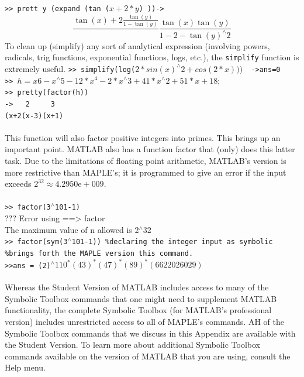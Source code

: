 \documentclass[../main.tex]{subfiles}
\begin{document}
\texttt{>> prett y (expand (tan ($x+2*y$) ))->}
$$
\frac{\tan (x)+2 \frac{\tan (y)}{1-\tan (y)}}{} \frac{\tan (x) \tan (y)}{1-2-\tan (y)^{\wedge}2}
$$
To clean up (simplify) any sort of analytical expression (involving powers, 
radicals, trig functions, exponential functions, logs, etc.), the \texttt{simplify} function 
is extremely useful. 
\texttt{>> simplify(log($2*sin(x)^{\wedge}2+cos(2*x)))$~~->ans=0 }\\
\texttt{>> $h=x 6-x^{\wedge}5-12*x^4-2*x^{\wedge}3+41*x^{\wedge}2+51*x+18;$ }\\
\texttt{>> pretty(factor(h)) }\\
\texttt{->  ~~2 ~~~ 3 }\\
\texttt{(x+2(x-3)(x+1)}\\
\\
This function will also factor positive integers into primes. This brings up an important point. MATLAB also has a function factor that (only) does this latter task. Due to the limitations of floating point arithmetic, MATLAB's version is more restrictive than MAPLE's; it is programmed to give an error if the input exceeds $2^{32} \approx 4.2950 \mathrm{e}+009$.
\\
\\
\texttt{>> factor(3$^{\wedge}$101-1) }\\
??? Error using ==> factor \\
The maximum value of n allowed is 2$^{\wedge}$32\\
\texttt{>> factor(sym(3$^{\wedge}$101-1)) \%declaring the integer input as symbolic 
}\\
\texttt{\%brings forth the MAPLE version this command. 
}\\
\texttt{>>ans = (2)$^{\wedge}110^*(43)^*(47)^*(89)^*(6622026029) $}
\\
\\
Whereas the Student Version of MATLAB includes access to many of the 
Symbolic Toolbox commands that one might need to supplement MATLAB 
functionality, the complete Symbolic Toolbox (for MATLAB's professional 
version) includes unrestricted access to all of MAPLE's commands. AH of the 
Symbolic Toolbox commands that we discuss in this Appendix are available with 
the Student Version. To learn more about additional Symbolic Toolbox 
commands available on the version of MATLAB that you are using, consult the 
Help menu. 


	
	
\end{document}
